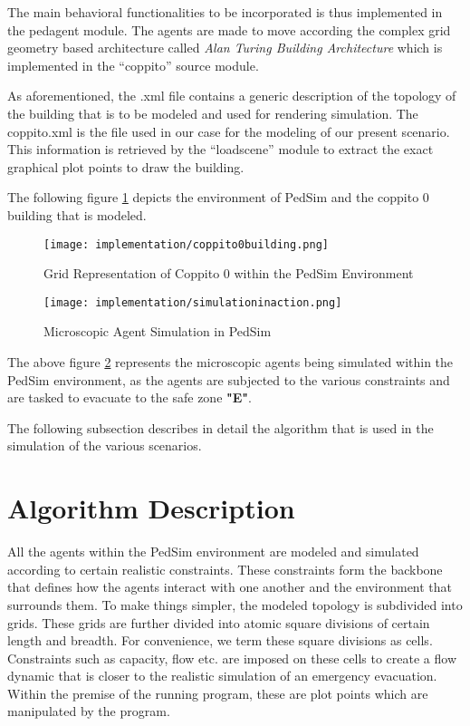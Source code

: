 The main behavioral functionalities to be incorporated is thus implemented in the ped\textunderscore agent module. The agents are made to move according the complex grid geometry based architecture called \textit{Alan Turing Building Architecture} which is implemented in the “coppito” source module.

As aforementioned, the .xml file contains a generic description of the topology of the building that is to be modeled and used for rendering simulation. The coppito.xml is the file used in our case for the modeling of our present scenario. This information is retrieved by the “loadscene” module to extract the exact graphical plot points to draw the building. 

The following figure \ref{coppito_pedsim} depicts the environment of PedSim and the coppito 0 building that is modeled. 

\begin{figure}[H]
  \centering
  \texttt{[image: implementation/coppito0building.png]}
  \caption{Grid Representation of Coppito 0 within the PedSim Environment}
  \label{coppito_pedsim}
\end{figure}

\begin{figure}[H]
  \centering
  \texttt{[image: implementation/simulationinaction.png]}
  \caption{Microscopic Agent Simulation in PedSim}
  \label{coppito_simulation}
\end{figure}

The above figure \ref{coppito_simulation} represents the microscopic agents being simulated within the PedSim environment, as the agents are subjected to the various constraints and are tasked to evacuate to the safe zone \textbf{"E"}.

The following subsection describes in detail the algorithm that is used in the simulation of the various scenarios. 


\section{Algorithm Description}
\label{sec: Algorithm Description}

All the agents within the PedSim environment are modeled and simulated according to certain realistic constraints. These constraints form the backbone that defines how the agents interact with one another and the environment that surrounds them. To make things simpler, the modeled topology is subdivided into grids. These grids are further divided into atomic square divisions of certain length and breadth. For convenience, we term these square divisions as cells. Constraints such as capacity, flow etc. are imposed on these cells to create a flow dynamic that is closer to the realistic simulation of an emergency evacuation. Within the premise of the running program, these are plot points which are manipulated by the program. 

